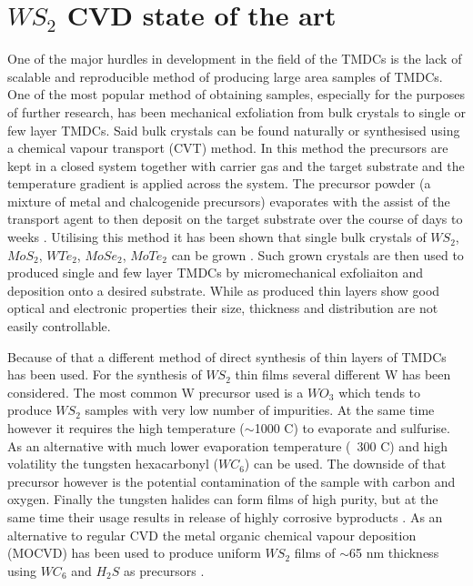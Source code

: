 \chapter{$WS_2$ CVD state of the art}

One of the major hurdles in development in the field of the TMDCs is the lack of scalable and reproducible method of producing large area samples of TMDCs. One of the most popular method of obtaining samples, especially for the purposes of further research, has been mechanical exfoliation from bulk crystals to single or few layer TMDCs. Said bulk crystals can be found naturally or synthesised using a chemical vapour transport (CVT) method. In this method the precursors are kept in a closed system together with carrier gas and the target substrate and the temperature gradient is applied across the system. The precursor powder (a mixture of metal and chalcogenide precursors) evaporates with the assist of the transport agent to then deposit on the target substrate over the course of days to weeks \cite{Reale2016}\cite{Schmidt2013}. Utilising this method it has been shown that single bulk crystals of $WS_2$, $MoS_2$, $WTe_2$, $MoSe_2$, $MoTe_2$ can be grown \cite{Reale2016}\cite{Schmidt2013}\cite{Al-Hilli1972}\cite{Brixner1962}\cite{Lenz1997}\cite{Brown1966}\cite{Sunil1997}\cite{Lenz1997}. Such grown crystals are then used to produced single and few layer TMDCs by micromechanical exfoliaiton and deposition onto a desired substrate. While as produced thin layers show good optical and electronic properties their size, thickness and distribution are not easily controllable.

Because of that a different method of direct synthesis of thin layers of TMDCs has been used. For the synthesis of $WS_2$ thin films several different W has been considered. The most common W precursor used is a $WO_3$ which tends to produce $WS_2$ samples with very low number of impurities. At the same time however it requires the high temperature ($\sim$1000 {\degree}C) to evaporate and sulfurise. As an alternative with much lower evaporation temperature (~300 {\degree}C) and high volatility the tungsten hexacarbonyl ($WC_6$) can be used. The downside of that precursor however is the potential contamination of the sample with carbon and oxygen. Finally the tungsten halides can form films of high purity, but at the same time their usage results in release of highly corrosive byproducts \cite{Reale2016}. As an alternative to regular CVD the metal organic chemical vapour deposition (MOCVD) has been used to produce uniform $WS_2$ films of $\sim$65 nm thickness using $WC_6$ and $H_2S$ as precursors \cite{Chung1998}.

